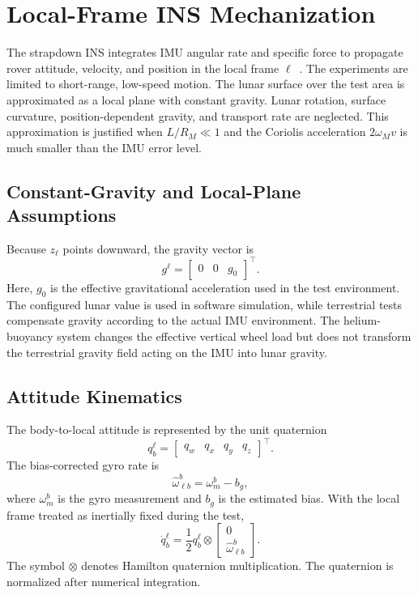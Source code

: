 \documentclass[]{IAC_style}
\begin{document}
\section{Local-Frame INS Mechanization}

The strapdown INS integrates IMU angular rate and specific force to propagate rover attitude, velocity, and position in the local frame $\ell$~\cite{titterton2004strapdown,groves2013principles}. The experiments are limited to short-range, low-speed motion. The lunar surface over the test area is approximated as a local plane with constant gravity. Lunar rotation, surface curvature, position-dependent gravity, and transport rate are neglected. This approximation is justified when $L/R_M\ll1$ and the Coriolis acceleration $2\omega_Mv$ is much smaller than the IMU error level.

\subsection{Constant-Gravity and Local-Plane Assumptions}

Because $z_\ell$ points downward, the gravity vector is
\begin{equation}
\tag{1}\label{eq:1}
g^\ell=\begin{bmatrix}0&0&g_0\end{bmatrix}^{\top}.
\end{equation}
Here, $g_0$ is the effective gravitational acceleration used in the test environment. The configured lunar value is used in software simulation, while terrestrial tests compensate gravity according to the actual IMU environment. The helium-buoyancy system changes the effective vertical wheel load but does not transform the terrestrial gravity field acting on the IMU into lunar gravity.

\subsection{Attitude Kinematics}

The body-to-local attitude is represented by the unit quaternion
\begin{equation*}
q_b^\ell=\begin{bmatrix}q_w&q_x&q_y&q_z\end{bmatrix}^{\top}.
\end{equation*}
The bias-corrected gyro rate is
\begin{equation}
\tag{2}\label{eq:2}
\hat{\omega}_{\ell b}^b=\omega_m^b-b_g,
\end{equation}
where $\omega_m^b$ is the gyro measurement and $b_g$ is the estimated bias. With the local frame treated as inertially fixed during the test,
\begin{equation}
\tag{3}\label{eq:3}
\dot q_b^\ell=\frac{1}{2}q_b^\ell\otimes\begin{bmatrix}0\\\hat{\omega}_{\ell b}^b\end{bmatrix}.
\end{equation}
The symbol $\otimes$ denotes Hamilton quaternion multiplication. The quaternion is normalized after numerical integration.
\end{document}
